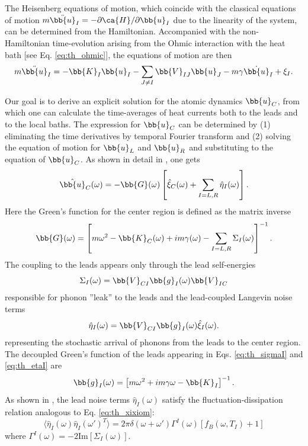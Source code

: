 The Heisenberg equations of motion, which coincide with the classical equations of motion $m\ddot{\bb{u}}_I=-\partial \ca{H}/\partial \bb{u}_I$ due to the linearity of the system, can be determined from the Hamiltonian. Accompanied with the non-Hamiltonian time-evolution arising from the Ohmic interaction with the heat bath [see Eq. \eqref{eq:th_ohmic}], the equations of motion are then
\begin{equation}
  m\ddot{\bb{u}}_I = - \bb{K}_I \bb{u}_I - \sum_{J\neq I} \bb{V}_{IJ} \bb{u}_J - m \gamma \dot{\bb{u}}_I + \xi_I. \label{eq:gfm_eom_I}
\end{equation}

Our goal is to derive an explicit solution for the atomic dynamics $\bb{u}_C$, from which one can calculate the time-averages of heat currents both to the leads and to the local baths. The expression for $\bb{u}_C$ can be determined by (1) eliminating the time derivatives by temporal Fourier transform and (2) solving the equation of motion for $\bb{u}_L$ and $\bb{u}_R$ and substituting to the equation of $\bb{u}_C$. As shown in detail in , one gets
\begin{equation}
 \hat{\bb{u}}_C(\omega) = - \bb{G}(\omega) \left[ \hat\xi_C(\omega) + \sum_{I=L,R} \hat{\eta}_I(\omega) \right]. \label{eq:gfm_uc_sol}
\end{equation}
Here the Green's function for the center region is defined as the matrix inverse
\begin{equation}
 \bb{G}(\omega) = \left[m\omega^2 - \bb{K}_C(\omega) +im\gamma(\omega) - \sum_{I=L,R} \Sigma_I(\omega)  \right]^{-1}.
\end{equation}
The coupling to the leads appears only through the lead self-energies
\begin{equation}
 \Sigma_I(\omega) = \bb{V}_{CI} \bb{g}_I(\omega) \bb{V}_{IC} \label{eq:th_sigmaI}
\end{equation}
responsible for phonon ''leak'' to the leads and the lead-coupled Langevin noise terms
\begin{equation}
 \hat\eta_I(\omega) = \bb{V}_{CI}\bb{g}_I(\omega) \hat{\xi}_I(\omega). \label{eq:th_etaI}
\end{equation}
representing the stochastic arrival of phonons from the leads to the center region. The decoupled Green's function of the leads appearing in Eqs. \eqref{eq:th_sigmaI} and \eqref{eq:th_etaI} are
\begin{equation}
 \bb{g}_I(\omega) = \left[m\omega^2+im\gamma\omega - \bb{K}_I \right]^{-1}.
\end{equation}
As shown in , the lead noise terms $\hat\eta_I(\omega)$ satisfy the fluctuation-dissipation relation analogous to Eq. \eqref{eq:th_xixiom}:
\begin{equation}
 \langle \hat\eta_I(\omega) \hat\eta_I(\omega')^T \rangle=2\pi\delta(\omega+\omega') \Gamma^I(\omega) \left[f_B(\omega,T_I)+1 \right] \label{eq:th_etaIetaI}
\end{equation}
where $\Gamma^I(\omega)=-2\textrm{Im}[\Sigma_I(\omega)]$.

